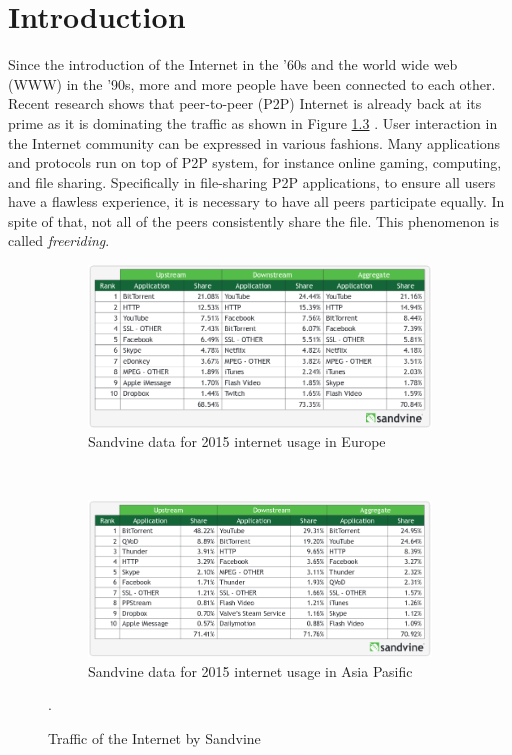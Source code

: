\chapter{Introduction}
\label{chp:introduction}
Since the introduction of the Internet in the '60s and the world wide web (WWW) in the '90s, more and more people have been connected to each other. Recent research shows that peer-to-peer (P2P) Internet is already back at its prime as it is dominating the traffic as shown in Figure \ref{fig:usage} \cite{2015:internettraffic:sandvine}. User interaction in the Internet community can be expressed in various fashions. Many applications and protocols run on top of P2P system, for instance online gaming, computing, and file sharing. Specifically in file-sharing P2P applications, to ensure all users have a flawless experience, it is necessary to have all peers participate equally. In spite of that, not all of the peers consistently share the file. This phenomenon is called \textit{freeriding}.

\begin{figure}[h]
	\centering
	\begin{subfigure}[b]{0.8\textwidth}
		\includegraphics[width=\linewidth]{pics/sandvineeu2015}
		\caption{Sandvine data for 2015 internet usage in Europe}
		\label{fig:usage1}
	\end{subfigure}\\
	\begin{subfigure}[b]{0.8\textwidth}
		\includegraphics[width=\linewidth]{pics/sandvineasia2015}
		\caption{Sandvine data for 2015 internet usage in Asia Pasific}
		\label{fig:usage2}
	\end{subfigure}%
	\caption{Traffic of the Internet by Sandvine \cite{2015:internettraffic:sandvine}}.
	\label{fig:usage}
\end{figure}

